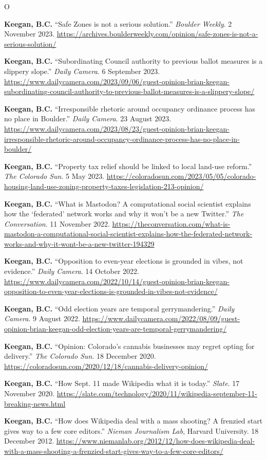 \documentclass{cv}
\begin{document}
\begin{entries}{O}
		\item \textbf{Keegan, B.C.} ``Safe Zones is not a serious solution.'' \textit{Boulder Weekly}. 2 November 2023. \url{https://archives.boulderweekly.com/opinion/safe-zones-is-not-a-serious-solution/}
		\item \textbf{Keegan, B.C.} ``Subordinating Council authority to previous ballot measures is a slippery slope.'' \textit{Daily Camera}. 6 September 2023. \url{https://www.dailycamera.com/2023/09/06/guest-opinion-brian-keegan-subordinating-council-authority-to-previous-ballot-measures-is-a-slippery-slope/}
		\item \textbf{Keegan, B.C.} ``Irresponsible rhetoric around occupancy ordinance process has no place in Boulder.'' \textit{Daily Camera}. 23 August 2023. \url{https://www.dailycamera.com/2023/08/23/guest-opinion-brian-keegan-irresponsible-rhetoric-around-occupancy-ordinance-process-has-no-place-in-boulder/}
		\item \textbf{Keegan, B.C.} ``Property tax relief should be linked to local land-use reform.'' \textit{The Colorado Sun}. 5 May 2023. \url{https://coloradosun.com/2023/05/05/colorado-housing-land-use-zoning-property-taxes-legislation-213-opinion/}
		\item \textbf{Keegan, B.C.} ``What is Mastodon? A computational social scientist explains how the `federated' network works and why it won't be a new Twitter.'' \textit{The Conversation}. 11 November 2022. \url{https://theconversation.com/what-is-mastodon-a-computational-social-scientist-explains-how-the-federated-network-works-and-why-it-wont-be-a-new-twitter-194329}
		\item \textbf{Keegan, B.C.} ``Opposition to even-year elections is grounded in vibes, not evidence.'' \textit{Daily Camera}. 14 October 2022. \url{https://www.dailycamera.com/2022/10/14/guest-opinion-brian-keegan-opposition-to-even-year-elections-is-grounded-in-vibes-not-evidence/}
		\item \textbf{Keegan, B.C.} ``Odd election years are temporal gerrymandering.'' \textit{Daily Camera}. 9 August 2022. \url{https://www.dailycamera.com/2022/08/09/guest-opinion-brian-keegan-odd-election-years-are-temporal-gerrymandering/}
		\item \textbf{Keegan, B.C.} ``Opinion: Colorado's cannabis businesses may regret opting for delivery.'' \textit{The Colorado Sun}. 18 December 2020. \url{https://coloradosun.com/2020/12/18/cannabis-delivery-opinion/}
		\item \textbf{Keegan, B.C.} ``How Sept. 11 made Wikipedia what it is today.'' \textit{Slate}. 17 November 2020. \url{https://slate.com/technology/2020/11/wikipedia-september-11-breaking-news.html}
		\item \textbf{Keegan, B.C.} ``How does Wikipedia deal with a mass shooting? A frenzied start gives way to a few core editors.'' \textit{Nieman Journalism Lab}, Harvard University. 18 December 2012. \url{https://www.niemanlab.org/2012/12/how-does-wikipedia-deal-with-a-mass-shooting-a-frenzied-start-gives-way-to-a-few-core-editors/}
	\end{entries}
\end{document}
